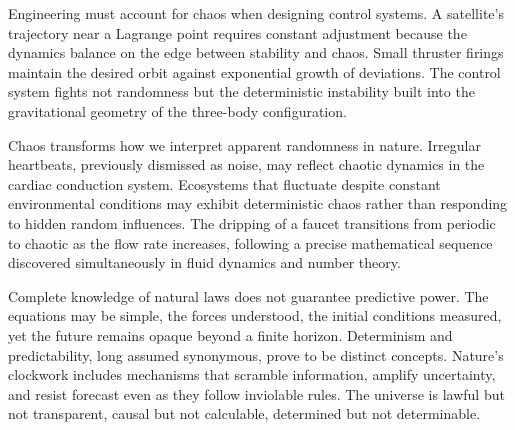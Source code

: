 Engineering must account for chaos when designing control systems. A satellite's trajectory near a Lagrange point requires constant adjustment because the dynamics balance on the edge between stability and chaos. Small thruster firings maintain the desired orbit against exponential growth of deviations. The control system fights not randomness but the deterministic instability built into the gravitational geometry of the three-body configuration.

Chaos transforms how we interpret apparent randomness in nature. Irregular heartbeats, previously dismissed as noise, may reflect chaotic dynamics in the cardiac conduction system. Ecosystems that fluctuate despite constant environmental conditions may exhibit deterministic chaos rather than responding to hidden random influences. The dripping of a faucet transitions from periodic to chaotic as the flow rate increases, following a precise mathematical sequence discovered simultaneously in fluid dynamics and number theory.

Complete knowledge of natural laws does not guarantee predictive power. The equations may be simple, the forces understood, the initial conditions measured, yet the future remains opaque beyond a finite horizon. Determinism and predictability, long assumed synonymous, prove to be distinct concepts. Nature's clockwork includes mechanisms that scramble information, amplify uncertainty, and resist forecast even as they follow inviolable rules. The universe is lawful but not transparent, causal but not calculable, determined but not determinable.

